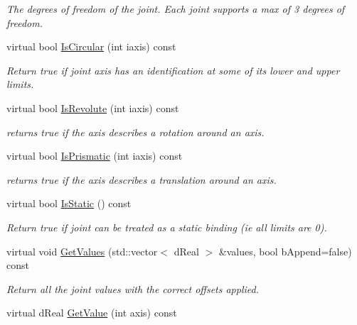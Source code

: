 \begin{DoxyCompactItemize}
\begin{DoxyCompactList}\small\item\em The degrees of freedom of the joint. Each joint supports a max of 3 degrees of freedom. \item\end{DoxyCompactList}\item 
virtual bool \hyperlink{classOpenRAVE_1_1KinBody_1_1Joint_a7adf99ae40bca7e94d926e3b56321fdb}{IsCircular} (int iaxis) const 
\begin{DoxyCompactList}\small\item\em Return true if joint axis has an identification at some of its lower and upper limits. \item\end{DoxyCompactList}\item 
virtual bool \hyperlink{classOpenRAVE_1_1KinBody_1_1Joint_a477d385f39817d9116efac236d56b54f}{IsRevolute} (int iaxis) const 
\begin{DoxyCompactList}\small\item\em returns true if the axis describes a rotation around an axis. \item\end{DoxyCompactList}\item 
virtual bool \hyperlink{classOpenRAVE_1_1KinBody_1_1Joint_a869db68ce6e40c67cc4c5f0f36d1a950}{IsPrismatic} (int iaxis) const 
\begin{DoxyCompactList}\small\item\em returns true if the axis describes a translation around an axis. \item\end{DoxyCompactList}\item 
\hypertarget{classOpenRAVE_1_1KinBody_1_1Joint_af52f395f0894e5c0a59548fcde7c353b}{
virtual bool \hyperlink{classOpenRAVE_1_1KinBody_1_1Joint_af52f395f0894e5c0a59548fcde7c353b}{IsStatic} () const }
\label{classOpenRAVE_1_1KinBody_1_1Joint_af52f395f0894e5c0a59548fcde7c353b}

\begin{DoxyCompactList}\small\item\em Return true if joint can be treated as a static binding (ie all limits are 0). \item\end{DoxyCompactList}\item 
virtual void \hyperlink{classOpenRAVE_1_1KinBody_1_1Joint_a04a882646ae62c1d8b2416bd525a18dc}{GetValues} (std::vector$<$ dReal $>$ \&values, bool bAppend=false) const 
\begin{DoxyCompactList}\small\item\em Return all the joint values with the correct offsets applied. \item\end{DoxyCompactList}\item 
\hypertarget{classOpenRAVE_1_1KinBody_1_1Joint_ae53c171bf98bb3b7bc5ab0fbd94bd90e}{
virtual dReal \hyperlink{classOpenRAVE_1_1KinBody_1_1Joint_ae53c171bf98bb3b7bc5ab0fbd94bd90e}{GetValue} (int axis) const }
\label{classOpenRAVE_1_1KinBody_1_1Joint_ae53c171bf98bb3b7bc5ab0fbd94bd90e}


\end{DoxyCompactItemize}
